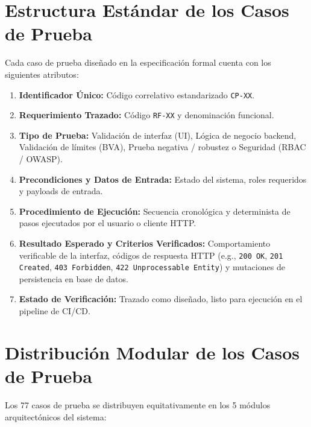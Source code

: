 \section{Estructura Estándar de los Casos de Prueba}
Cada caso de prueba diseñado en la especificación formal cuenta con los siguientes atributos:
\begin{enumerate}
    \item \textbf{Identificador Único:} Código correlativo estandarizado \texttt{CP-XX}.
    \item \textbf{Requerimiento Trazado:} Código \texttt{RF-XX} y denominación funcional.
    \item \textbf{Tipo de Prueba:} Validación de interfaz (UI), Lógica de negocio backend, Validación de límites (BVA), Prueba negativa / robustez o Seguridad (RBAC / OWASP).
    \item \textbf{Precondiciones y Datos de Entrada:} Estado del sistema, roles requeridos y payloads de entrada.
    \item \textbf{Procedimiento de Ejecución:} Secuencia cronológica y determinista de pasos ejecutados por el usuario o cliente HTTP.
    \item \textbf{Resultado Esperado y Criterios Verificados:} Comportamiento verificable de la interfaz, códigos de respuesta HTTP (e.g., \texttt{200 OK}, \texttt{201 Created}, \texttt{403 Forbidden}, \texttt{422 Unprocessable Entity}) y mutaciones de persistencia en base de datos.
    \item \textbf{Estado de Verificación:} Trazado como diseñado, listo para ejecución en el pipeline de CI/CD.
\end{enumerate}

\section{Distribución Modular de los Casos de Prueba}
Los 77 casos de prueba se distribuyen equitativamente en los 5 módulos arquitectónicos del sistema:

